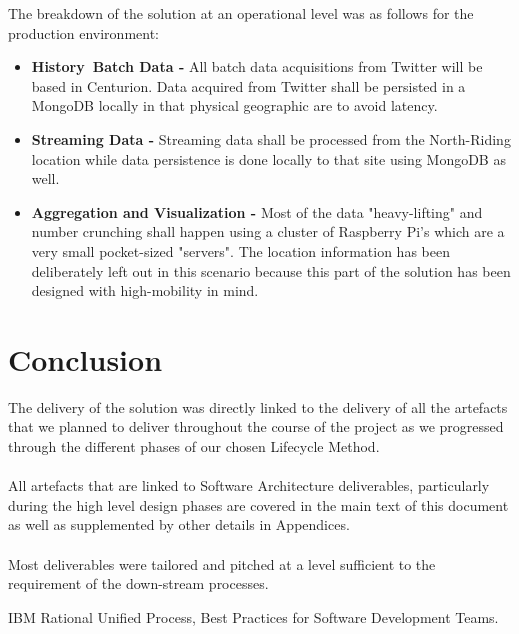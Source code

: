 \documentclass[12pt]{article} %
\begin{document}
	The breakdown of the solution at an operational level was as follows for the production environment:
	
	\begin{itemize}
		\item \textbf{History\ Batch Data -} All batch data acquisitions from Twitter will be based in Centurion. Data acquired from Twitter shall be persisted in a MongoDB locally in that physical geographic are to avoid latency.
		\item \textbf{Streaming Data -} Streaming data shall be processed from the North-Riding location while data persistence is done locally to that site using MongoDB as well.
		\item \textbf{Aggregation and Visualization -} Most of the data "heavy-lifting" and number crunching shall happen using a cluster of Raspberry Pi's which are a very small pocket-sized "servers". The location information has been deliberately left out in this scenario because this part of the solution has been designed with high-mobility in mind.
	\end{itemize}
	
	
	\section{Conclusion} %
	
	The delivery of the solution was directly linked to the delivery of all the artefacts that we planned to deliver throughout the course of the project as we progressed through the different phases of our chosen Lifecycle Method.
	\\
	\\
	All artefacts that are linked to Software Architecture deliverables, particularly during the high level design phases are covered in the main text of this document as well as supplemented by other details in Appendices.
	\\
	\\
	Most deliverables were tailored and pitched at a level sufficient to the requirement of the down-stream processes.
	
	
	
	
	\newpage
	
	
	\begin{thebibliography}{99} %
		
		 IBM Rational Unified Process, Best Practices for Software Development Teams.

	\end{thebibliography}
	
\end{document}

